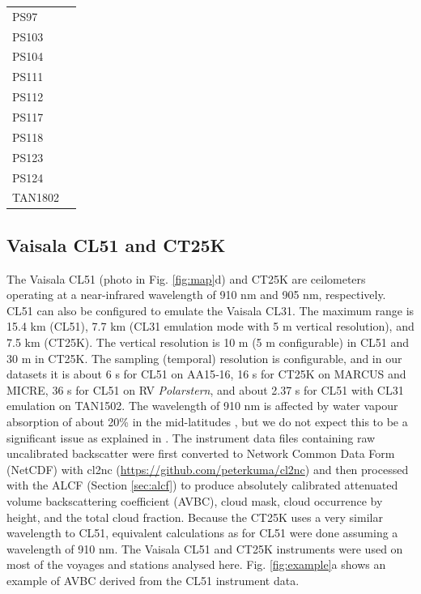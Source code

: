 \documentclass[12pt,a4paper]{article}
\begin{document}
\begin{table}[t!]
\begin{tabular}{lp{14.5cm}}
PS97     & \cite{kniglanglo2016f,kniglanglo2016g,kniglanglo2016h,kniglanglo2016i,lamy2017} \\
PS103    & \cite{kniglanglo2017a,kniglanglo2017b,kniglanglo2017c,kniglanglo2017d,boebel2018} \\
PS104    & \cite{kniglanglo2017e,kniglanglo2017f,kniglanglo2017g,gohl2018,schmithsen2021a} \\
PS111    & \cite{schmithsen2019a,schmithsen2020a,schmithsen2021b,schmithsen2021c,schrder2018} \\
PS112    & \cite{schmithsen2019b,schmithsen2020b,schmithsen2021d,schmithsen2021e,meyer2018} \\
PS117    & \cite{schmithsen2019c,schmithsen2020c,schmithsen2021f,schmithsen2021g,boebel2019} \\
PS118    & \cite{schmithsen2019d,schmithsen2020d,schmithsen2021h,schmithsen2021i,dorschel2019} \\
PS123    & \cite{schmithsen2021j,schmithsen2021m,schmithsen2021n,schmithsen2021k,hoppmann2023} \\
PS124    & \cite{schmithsen2021o,schmithsen2021q,schmithsen2021p,hoppmann2023} \\
TAN1802  & \cite{kremser2020,kremser2021} \\
\end{tabular}
\end{table}

\subsection{Vaisala CL51 and CT25K}
\label{sec:cl51}

The Vaisala CL51 (photo in Fig. \ref{fig:map}d) and CT25K are ceilometers
operating at a near-infrared wavelength of 910 nm and 905 nm, respectively.
CL51 can also be configured to emulate the Vaisala CL31. The maximum range is
15.4 km (CL51), 7.7 km (CL31 emulation mode with 5 m vertical resolution), and
7.5 km (CT25K). The vertical resolution is 10 m (5 m configurable) in CL51 and
30 m in CT25K. The sampling (temporal) resolution is configurable, and in our
datasets it is about 6 s for CL51 on AA15‐16, 16 s for CT25K on MARCUS and
MICRE, 36 s for CL51 on RV \emph{Polarstern}, and about 2.37 s for CL51 with
CL31 emulation on TAN1502. The wavelength of 910 nm is affected by water vapour
absorption of about 20\% in the mid-latitudes \citep{wiegner2015,wiegner2019},
but we do not expect this to be a significant issue as explained in
\cite{kuma2021}.  The instrument data files containing raw uncalibrated
backscatter were first converted to Network Common Data Form (NetCDF) with
cl2nc (\url{https://github.com/peterkuma/cl2nc}) and then processed with the
ALCF (Section \ref{sec:alcf}) to produce absolutely calibrated attenuated
volume backscattering coefficient (AVBC), cloud mask, cloud occurrence by
height, and the total cloud fraction. Because the CT25K uses a very similar
wavelength to CL51, equivalent calculations as for CL51 were done assuming a
wavelength of 910 nm. The Vaisala CL51 and CT25K instruments were used on most
of the voyages and stations analysed here. Fig.  \ref{fig:example}a shows an
example of AVBC derived from the CL51 instrument data.
\end{document}
